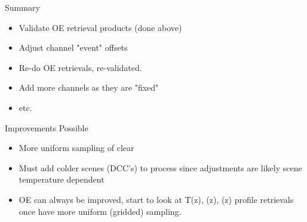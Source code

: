 \documentclass[10pt,t]{beamer}
\begin{document}
\begin{frame}[label={sec:org2489db7}]{Summary}
\begin{itemize}
\item Validate OE retrieval products (done above)
\item Adjust channel "event" offsets
\item Re-do OE retrievals, re-validated.
\item Add more channels as they are "fixed"
\item etc.
\end{itemize}

\begin{block}{Improvements Possible}
\begin{itemize}
\item More uniform sampling of clear
\item Must add colder scenes (DCC's) to process since adjustments are likely scene temperature dependent
\item OE can always be improved, start to look at T(z), \water(z), \ozone(z) profile retrievals once have more uniform (gridded) sampling.
\end{itemize}
\end{block}
\end{frame}
\end{document}

